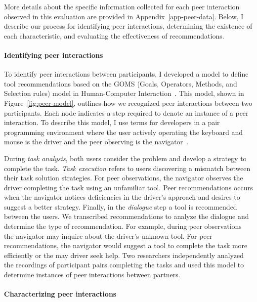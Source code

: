 More details about the specific information collected for each peer interaction observed in this evaluation are provided in Appendix~\ref{app-peer-data}. Below, I describe our process for identifying peer interactions, determining the existence of each characteristic, and evaluating the effectiveness of recommendations.

\paragraph*{Identifying peer interactions}

To identify peer interactions between participants, I developed a model to define tool recommendations based on the GOMS (Goals, Operators, Methods, and Selection rules) model in Human-Computer Interaction~\cite{diaper2003handbook}. This model, shown in Figure~\ref{fig:peer-model}, outlines how we recognized peer interactions between two participants. Each node indicates a step required to denote an instance of a peer interaction. To describe this model, I use terms for developers in a pair programming environment where the user actively operating the keyboard and mouse is the driver and the peer observing is the navigator~\cite{Cockburn01Pair}. 

During \textit{task analysis}, both users consider the problem and develop a strategy to complete the task. \textit{Task execution} refers to users discovering a mismatch between their task solution strategies. For peer observations, the navigator observes the driver completing the task using an unfamiliar tool. Peer recommendations occurs when the navigator notices deficiencies in the driver's approach and desires to suggest a better strategy. Finally, in the \textit{dialogue} step a tool is recommended between the users. We transcribed recommendations to analyze the dialogue and determine the type of recommendation. For example, during peer observations the navigator may inquire about the driver's unknown tool. For peer recommendations, the navigator would suggest a tool to complete the task more efficiently or the may driver seek help. Two researchers independently analyzed the recordings of participant pairs completing the tasks and used this model to determine instances of peer interactions between partners.

\paragraph*{Characterizing peer interactions}


